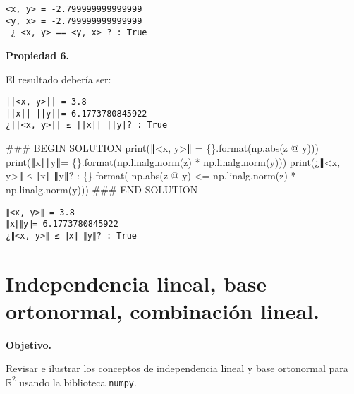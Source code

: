 \documentclass[
  letterpaper,
  DIV=11,
  numbers=noendperiod]{scrreprt}
\newenvironment{Shaded}{\begin{snugshade}}{\end{snugshade}}
\newcommand{\BuiltInTok}[1]{\textcolor[rgb]{0.00,0.23,0.31}{#1}}
\newcommand{\CommentTok}[1]{\textcolor[rgb]{0.37,0.37,0.37}{#1}}
\newcommand{\NormalTok}[1]{\textcolor[rgb]{0.00,0.23,0.31}{#1}}
\newcommand{\OperatorTok}[1]{\textcolor[rgb]{0.37,0.37,0.37}{#1}}
\newcommand{\RegionMarkerTok}[1]{\textcolor[rgb]{0.00,0.23,0.31}{#1}}
\newcommand{\SpecialCharTok}[1]{\textcolor[rgb]{0.37,0.37,0.37}{#1}}
\newcommand{\StringTok}[1]{\textcolor[rgb]{0.13,0.47,0.30}{#1}}
\begin{document}
\begin{verbatim}
<x, y> = -2.799999999999999
<y, x> = -2.799999999999999
 ¿ <x, y> == <y, x> ? : True
\end{verbatim}

\textbf{Propiedad 6.}

El resultado debería ser:

\begin{verbatim}
||<x, y>|| = 3.8
||x|| ||y||= 6.1773780845922
¿||<x, y>|| ≤ ||x|| ||y|? : True
\end{verbatim}

\begin{Shaded}
\begin{Highlighting}[]
\CommentTok{\#\#\# }\RegionMarkerTok{BEGIN}\CommentTok{ SOLUTION}
\BuiltInTok{print}\NormalTok{(}\StringTok{\textquotesingle{}∥\textless{}x, y\textgreater{}∥ = }\SpecialCharTok{\{\}}\StringTok{\textquotesingle{}}\NormalTok{.}\BuiltInTok{format}\NormalTok{(np.}\BuiltInTok{abs}\NormalTok{(z }\OperatorTok{@}\NormalTok{ y)))}
\BuiltInTok{print}\NormalTok{(}\StringTok{\textquotesingle{}∥x∥∥y∥= }\SpecialCharTok{\{\}}\StringTok{\textquotesingle{}}\NormalTok{.}\BuiltInTok{format}\NormalTok{(np.linalg.norm(z) }\OperatorTok{*}\NormalTok{ np.linalg.norm(y)))}
\BuiltInTok{print}\NormalTok{(}\StringTok{\textquotesingle{}¿∥\textless{}x, y\textgreater{}∥ ≤ ∥x∥ ∥y∥? : }\SpecialCharTok{\{\}}\StringTok{\textquotesingle{}}\NormalTok{.}\BuiltInTok{format}\NormalTok{( np.}\BuiltInTok{abs}\NormalTok{(z }\OperatorTok{@}\NormalTok{ y) }\OperatorTok{\textless{}=}\NormalTok{ np.linalg.norm(z) }\OperatorTok{*}\NormalTok{ np.linalg.norm(y)))}
\CommentTok{\#\#\# }\RegionMarkerTok{END}\CommentTok{ SOLUTION}
\end{Highlighting}
\end{Shaded}

\begin{verbatim}
∥<x, y>∥ = 3.8
∥x∥∥y∥= 6.1773780845922
¿∥<x, y>∥ ≤ ∥x∥ ∥y∥? : True
\end{verbatim}


\chapter{Independencia lineal, base ortonormal, combinación
lineal.}\label{independencia-lineal-base-ortonormal-combinaciuxf3n-lineal.}

\textbf{Objetivo.}

Revisar e ilustrar los conceptos de independencia lineal y base
ortonormal para \(\mathbb{R}^2\) usando la biblioteca \texttt{numpy}.
\end{document}
